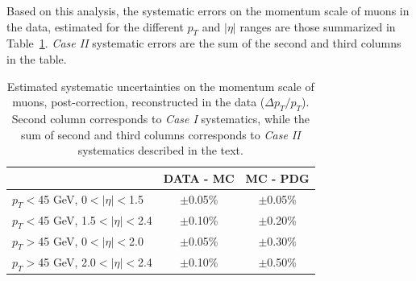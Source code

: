Based on this analysis, the systematic errors on the momentum scale of
muons in the data, estimated for the
different $p_T$ and $|\eta|$ ranges are those summarized in
Table~\ref{tab:systematics}. {\sl Case II} systematic errors are the sum of the
second and third columns in the table.
\begin{table}[hbH]
\begin{center}
\caption{Estimated systematic uncertainties on the momentum scale
  of muons, post-correction, reconstructed in the data ($\Delta p_T/p_T$).
  Second column corresponds to {\sl Case I} systematics, while
  the sum of second and third columns corresponds to {\sl Case II}
  systematics described in the text.\label{tab:systematics}} 
\begin{tabular}{|l|c|c|}
\hline
 & DATA - MC & MC - PDG \\
\hline 
$p_T<$45 GeV,   0$<|\eta|<$1.5 & $\pm$0.05\%& $\pm$0.05\% \\
$p_T<$45 GeV, 1.5$<|\eta|<$2.4 & $\pm$0.10\%& $\pm$0.20\% \\
$p_T>$45 GeV,   0$<|\eta|<$2.0 & $\pm$0.05\%& $\pm$0.30\% \\
$p_T>$45 GeV, 2.0$<|\eta|<$2.4 & $\pm$0.10\%& $\pm$0.50\% \\
\hline
\hline
\end{tabular}
\end{center}
\end{table}
